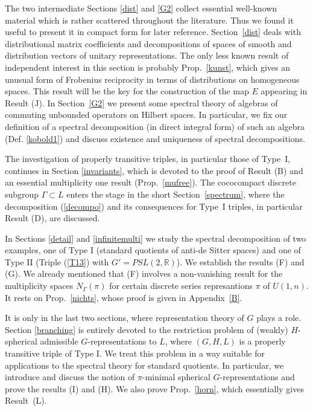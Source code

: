 \documentclass[10]{amsart}
\theoremstyle{remark}
\theoremstyle{definition}
\numberwithin{equation}{section}
\newcommand{\R}{\mathbb{R}}           %
\begin{document}
{The two intermediate Sections \ref{dist} and \ref{G2} collect essential well-known material which is rather scattered throughout the literature. Thus we found it useful to present it in compact form for later reference. Section~\ref{dist} deals with distributional matrix coefficients and decompositions of spaces of smooth and distribution vectors of unitary representations. The only less known result of independent interest in this section is probably
Prop.~\ref{kunst}, which gives an unusual form of Frobenius reciprocity in terms of distributions on homogeneous spaces. This result will be the key for the construction of the map $E$
appearing in Result (J). In Section~\ref{G2} we present some spectral theory of algebras of commuting unbounded operators on Hilbert spaces. In particular, we fix our definition of a spectral
decomposition (in direct integral form) of such an algebra (Def. \ref{kobold1}) and discuss existence and uniqueness of spectral decompositions.

The investigation of properly transitive triples, in particular those of Type~I, continues in Section \ref{invariants}, which is devoted to the proof of Result (B) and an essential multiplicity one result (Prop.~\ref{mufree}). The cococompact discrete subgroup $\Gamma\subset L$ enters the stage in the short Section~\ref{spectrum}, where the decomposition (\ref{decompo}) and its consequences for Type~I triples, in particular Result (D), are discussed.

In Sections \ref{detail} and \ref{infinitemulti} we study the spectral decomposition of two examples, one of Type I (standard quotients of anti-de Sitter spaces) and one of Type II (Triple (\ref{T13}) with
$G'=PSL(2,\R)$). We establish the results (F) and (G). We already mentioned that (F) involves a non-vanishing result for the multiplicity spaces $N_\Gamma(\pi)$ for certain discrete series represantions $\pi$ of $U(1,n)$. It rests on Prop.~\ref{nichts}, whose proof is given in Appendix~\ref{B}.

It is only in the last two sections, where representation theory of $G$ plays a role. Section \ref{branching} is entirely devoted to the restriction problem of (weakly) $H$-spherical admissible
$G$-representations to $L$, where $(G,H,L)$ is a properly transitive triple of Type I. We treat this problem in a way suitable for applications to the spectral theory for standard quotients.
In particular, we introduce and discuss the notion of $\pi$-minimal spherical $G$-representations and prove the results (I) and (H). We also prove Prop.~\ref{horn}, which essentially gives Result~(L).

}
\end{document}
